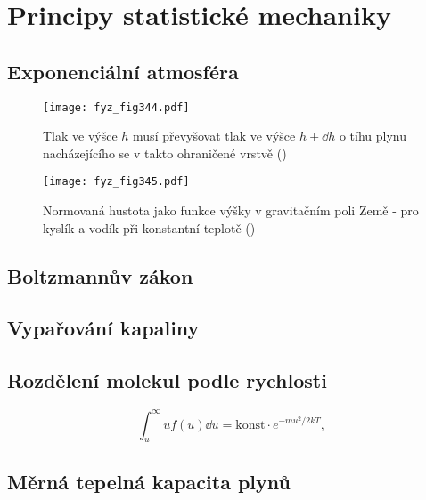 \setchaptertoc
\chapter{Principy statistické mechaniky}\label{fyz:IchapXL}

  \section{Exponenciální atmosféra}\label{fyz:IchapXLsecI}

    \begin{figure}[ht!] %
      \centering
      \texttt{[image: fyz\_fig344.pdf]}
      \caption{Tlak ve výšce \(h\) musí převyšovat tlak ve výšce \(h+\dd{h}\) o tíhu plynu 
               nacházejícího se v takto ohraničené vrstvě
               (\cite[s.~540]{Feynman01})}
      \label{fyz:fig344}
    \end{figure}

    \begin{figure}[ht!] %
      \centering
      \texttt{[image: fyz\_fig345.pdf]}
      \caption{Normovaná hustota jako funkce výšky v gravitačním poli Země - pro kyslík a vodík při 
               konstantní teplotě
               (\cite[s.~541]{Feynman01})}
      \label{fyz:fig345}
    \end{figure}
    
  \section{Boltzmannův zákon}\label{fyz:IchapXLsecII}
  \section{Vypařování kapaliny}\label{fyz:IchapXLsecIII}
  \section{Rozdělení molekul podle rychlosti}\label{fyz:IchapXLsecIV}
    \begin{equation}\label{fyz:eq572}
      \int_u^\infty uf(u)\dd{u} = \text{konst}\cdot e^{-mu^2/2kT},
    \end{equation}
  \section{Měrná tepelná kapacita plynů}\label{fyz:IchapXLsecV}
